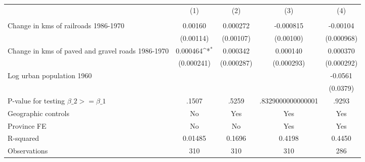 {
\def\sym#1{\ifmmode^{#1}\else\(^{#1}\)\fi}
\begin{tabular}{l*{4}{c}}
\hline\hline
                &\multicolumn{1}{c}{(1)}&\multicolumn{1}{c}{(2)}&\multicolumn{1}{c}{(3)}&\multicolumn{1}{c}{(4)}\\
                &\multicolumn{1}{c}{}&\multicolumn{1}{c}{}&\multicolumn{1}{c}{}&\multicolumn{1}{c}{}\\
\hline
Change in kms of railroads 1986-1970&  0.00160         & 0.000272         &-0.000815         & -0.00104         \\
                &(0.00114)         &(0.00107)         &(0.00100)         &(0.000968)         \\
[1em]
Change in kms of paved and gravel roads 1986-1970& 0.000464\sym{*}  & 0.000342         & 0.000140         & 0.000370         \\
                &(0.000241)         &(0.000287)         &(0.000293)         &(0.000292)         \\
[1em]
Log urban population 1960&                  &                  &                  &  -0.0561         \\
                &                  &                  &                  & (0.0379)         \\
\hline
P-value for testing $\beta\_{2} >= \beta\_{1}$&    .1507         &    .5259         &.8329000000000001         &    .9293         \\
Geographic controls&       No         &      Yes         &      Yes         &      Yes         \\
Province FE     &       No         &       No         &      Yes         &      Yes         \\
R-squared       &  0.01485         &   0.1696         &   0.4198         &   0.4450         \\
Observations    &      310         &      310         &      310         &      286         \\
\hline\hline
\end{tabular}
}
